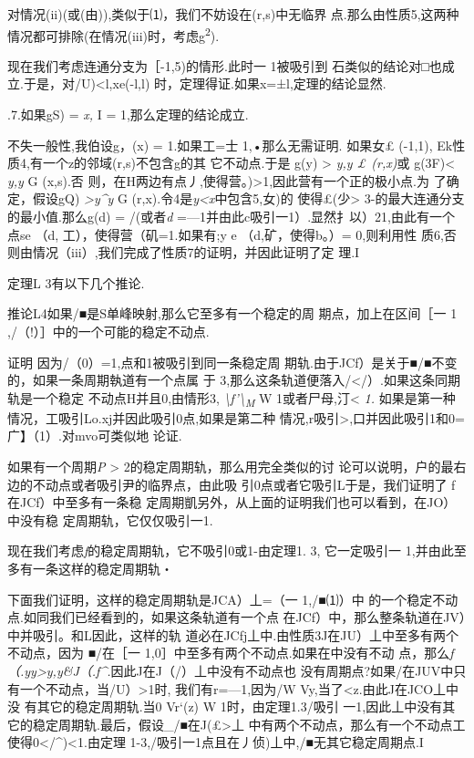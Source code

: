 对情况(ii)(或(由)),类似于⑴，我们不妨设在(r,s)中无临界
点.那么由性质5,这两种情况都可排除(在情况(iii)时，考虑g\textsuperscript{2}).

现在我们考虑连通分支为［-1,5)的情形.此时一 1被吸引到
石类似的结论对□也成立.于是，对\textbar{}/U)\textbar{}\textless{}l,xe(-l,l)
时，定理得证.如果x=±l,定理的结论显然.

.7.如果gS) = \emph{x,} I = 1,那么定理的结论成立.

不失一般性,我伯设g，(x) = 1.如果工=士 1,•那么无需证明. 如果女£ (-1,1),
Ek性质4,有一个z的邻域(r,s)不包含g的其 它不动点.于是 g(y) \textgreater{}
\emph{y,y £ (r,x)}或 g(3F)\textless{} \emph{y,y} G (x,s).否
则，在H两边有点丿,使得营。)\textgreater{}1,因此营有一个正的极小点.为
了确定，假设gQ) \emph{\textgreater{}y\^{}y} G
(r,x).令4是\emph{y\textless{}x}中包含5,女)的 使得£(少\textgreater{}
3-的最大连通分支的最小值.那么g(d) = /(或者\emph{d}
=---1并由此c吸引一1）.显然扌以）21,由此有一个点se （d,
工），使得营（矶=1.如果有;y e （d,矿，使得b。）= 0,则利用性
质6,否则由情况（iii）,我们完成了性质7的证明，并因此证明了定 理.I

定理L 3有以下几个推论.

推论L4如果/■是S单峰映射,那么它至多有一个稳定的周 期点，加上在区间［一 1
,/（!）］中的一个可能的稳定不动点.

证明 因为/（0）=1,点和1被吸引到同一条稳定周
期轨.由于JCf）是关于■/■不变的，如果一条周期執道有一个点属 于
3,那么这条轨道便落入/\textless{}/）.如果这条同期轨是一个稳定
不动点H并且0,由情形3,
\emph{\textbackslash{}f'\textbackslash{}\textsubscript{M}} W
1或者\textbar{}尸\textbar{}母,汀\textless{} \emph{1.}
如果是第一种情况，工吸引Lo.xj并因此吸引0点,如果是第二种
情况,r吸引\textbar{}\textgreater{},口并因此吸引1和0=广】（1）.对mvo可类似地
论证.

如果有一个周期\emph{P} \textgreater{} 2的稳定周期轨，那么用完全类似的讨
论可以说明，户的最右边的不动点或者吸引尹的临界点，由此吸
引0点或者它吸引L于是，我们证明了 f在JCf）中至多有一条稳
定周期凱另外，从上面的证明我们也可以看到，在JO）中没有稳
定周期轨，它仅仅吸引一1.

现在我们考虑\emph{f}的稳定周期轨，它不吸引0或1-由定理1. 3, 它一定吸引一
1,并由此至多有一条这样的稳定周期轨・

下面我们证明，这样的稳定周期轨是JCA）丄=（一 1,/■⑴）中
的一个稳定不动点.如同我们已经看到的，如果这条轨道有一个点
在JCf）中，那么整条轨道在JV）中并吸引。和L因此，这样的轨
道必在JCfj丄中.由性质3J在JU）丄中至多有两个不动点，因为 ■/在［一
1,0］中至多有两个不动点.如果在中没有不动
点，那么\emph{f（.yy\textgreater{}y,y\&J（.f\^{}.}因此J在J（/）丄中没有不动点也
没有周期点?如果/在JUV中只有一个不动点，当/U）\textgreater{}1时,
我们有r=---1,因为/W Vy,当了\textless{}z.由此J在JCO丄中没
有其它的稳定周期轨.当0 Vr`(z) W 1时，由定理1.3/吸引
一1,因此丄中没有其它的稳定周期轨.最后，假设\_/■在J(£\textgreater{}丄
中有两个不动点，那么有一个不动点工使得0\textless{}/\^{})\textless{}1.由定理
1-3,/吸引一1点且在丿侦)丄中,/■无其它稳定周期点.I

